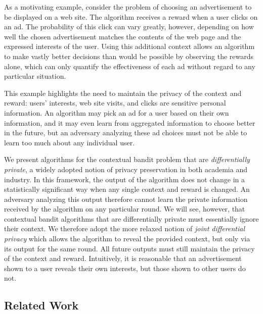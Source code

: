 \documentclass{article}
\DeclarePairedDelimiter{\paren}()
\begin{document}
As a motivating example, consider the problem of choosing an
advertisement to be displayed on a web site.  The algorithm receives a
reward when a user clicks on an ad.  The probability of this click can
vary greatly, however, depending on how well the chosen advertisement
matches the contents of the web page and the expressed interests of
the user.  Using this additional context allows an algorithm to make
vastly better decisions than would be possible by observing the
rewards alone, which can only quantify the effectiveness of each ad
without regard to any particular situation.

This example highlights the need to maintain the privacy of the
context and reward: users' interests, web site visits, and clicks are
sensitive personal information.  An algorithm may pick an ad for a
user based on their own information, and it may even learn from
aggregated information to choose better in the future, but an
adversary analyzing these ad choices must not be able to learn too
much about any individual user.

We present algorithms for the contextual bandit problem that are
\emph{differentially private}, a widely adopted notion of privacy
preservation in both academia and industry.  In this framework, the
output of the algorithm does not change in a statistically significant
way when any single context and reward is changed.  An adversary
analyzing this output therefore cannot learn the private information
received by the algorithm on any particular round.  We will see,
however, that contextual bandit algorithms that are differentially
private must essentially ignore their context.  We therefore adopt the
more relaxed notion of \emph{joint differential privacy} which allows
the algorithm to reveal the provided context, but only via its output
for the same round.  All future outputs must still maintain the
privacy of the context and reward.  Intuitively, it is reasonable that
an advertisement shown to a user reveals their own interests, but
those shown to other users do not.



\subsection{Related Work}
\label{sec:related-work}
\end{document}

